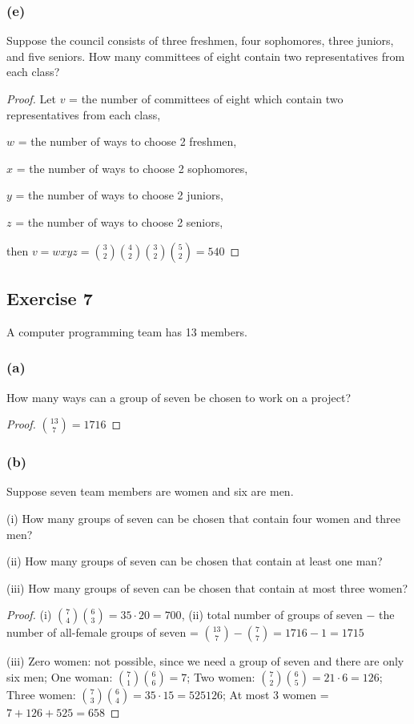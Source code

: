 \documentclass[14pt]{extarticle}
\begin{document}
\subsubsection{(e)}
Suppose the council consists of three freshmen, four sophomores, three juniors, and five seniors. How many
committees of eight contain two representatives from each class?

\begin{proof}
     Let \(v\) = the number of committees of eight which contain two representatives from each class,

     \(w\) = the number of ways to choose 2 freshmen,

     \(x\) = the number of ways to choose 2 sophomores,

     \(y\) = the number of ways to choose 2 juniors,

     \(z\) = the number of ways to choose 2 seniors,

     then \(v = wxyz = \binom{3}{2}\binom{4}{2}\binom{3}{2}\binom{5}{2} = 540\)
\end{proof}

\subsection{Exercise 7}
A computer programming team has 13 members.

\subsubsection{(a)}
How many ways can a group of seven be chosen to work on a project?

\begin{proof}
     \(\binom{13}{7} = 1716\)
\end{proof}

\subsubsection{(b)}
Suppose seven team members are women and six are men.

(i) How many groups of seven can be chosen that contain four women and three men?

(ii) How many groups of seven can be chosen that contain at least one man?

(iii) How many groups of seven can be chosen that contain at most three women?

\begin{proof}
     (i) \(\binom{7}{4}\binom{6}{3} = 35 \cdot 20 = 700\), (ii) total number of groups of seven \(-\) the number of all-female
     groups of seven = \(\binom{13}{7} - \binom{7}{7} = 1716 - 1 = 1715\)

     (iii) Zero women: not possible, since we need a group of seven and there are only six men; One woman: \(\binom{7}{1}
     \binom{6}{6} = 7\); Two women: \(\binom{7}{2}\binom{6}{5} = 21 \cdot 6 = 126\); Three women: \(\binom{7}{3}\binom{6}{4}
     = 35 \cdot 15 = 525 126\); At most 3 women = \(7 + 126 + 525 = 658\)
\end{proof}
\end{document}
